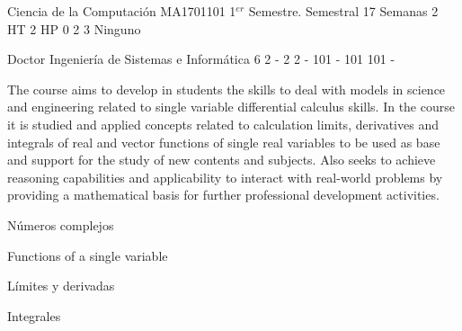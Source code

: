 \documentclass[a4paper,8pt]{article}
\begin{document}
\setNombreProfesor{}
\setGradoProfesorAbreviado{}
\sylabusHeader

\academicaTable
{Ciencia de la Computación} %
{MA1701101} %
{1$^{er}$ Semestre.} %
{Semestral} %
{17 Semanas} %
{2 HT} %
{2 HP} %
{0} %
{}  %
{2} %
{3} %
{Ninguno} %

\administrativaTable
{Doctor} %
{Ingeniería de Sistemas e Informática} %
{6} %
{2} %
{-} %
{2} %
{2} %
{-} %
{101} %
{-} %
{101} %
{101} %
{-} %


\begin{fundamentacion}
The course aims to develop in students the skills to deal with models in science and engineering related to
single variable differential calculus skills. In the course it is studied and applied concepts related to calculation
limits, derivatives and integrals of real and vector functions of single real variables to be used as base and
support for the study of new contents and subjects. Also seeks to achieve reasoning capabilities and
applicability to interact with real-world problems by providing a mathematical basis for further professional
development activities.

\end{fundamentacion}

\begin{sumilla}
\item Números complejos
\item Functions of a single variable
\item Límites y derivadas
\item Integrales

\end{sumilla}

\begin{competenciasAsignatura}
\item {}
\item {}
\item {}

\end{competenciasAsignatura}
\end{document}
